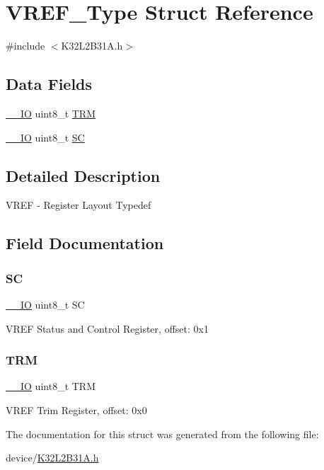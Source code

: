 \hypertarget{struct_v_r_e_f___type}{}\section{V\+R\+E\+F\+\_\+\+Type Struct Reference}
\label{struct_v_r_e_f___type}


{\ttfamily \#include $<$K32\+L2\+B31\+A.\+h$>$}

\subsection*{Data Fields}
\begin{DoxyCompactItemize}
\item 
\mbox{\hyperlink{core__cm0plus_8h_aec43007d9998a0a0e01faede4133d6be}{\+\_\+\+\_\+\+IO}} uint8\+\_\+t \mbox{\hyperlink{struct_v_r_e_f___type_acdaf356ffe42125ef3a82e4439a2e3c9}{T\+RM}}
\item 
\mbox{\hyperlink{core__cm0plus_8h_aec43007d9998a0a0e01faede4133d6be}{\+\_\+\+\_\+\+IO}} uint8\+\_\+t \mbox{\hyperlink{struct_v_r_e_f___type_a369ca7d5284929a823dab79b7d10d81f}{SC}}
\end{DoxyCompactItemize}


\subsection{Detailed Description}
V\+R\+EF -\/ Register Layout Typedef 

\subsection{Field Documentation}
\mbox{\label{struct_v_r_e_f___type_a369ca7d5284929a823dab79b7d10d81f}} 
\subsubsection{\texorpdfstring{SC}{SC}}
{\footnotesize\ttfamily \mbox{\hyperlink{core__cm0plus_8h_aec43007d9998a0a0e01faede4133d6be}{\+\_\+\+\_\+\+IO}} uint8\+\_\+t SC}

V\+R\+EF Status and Control Register, offset\+: 0x1 \mbox{\label{struct_v_r_e_f___type_acdaf356ffe42125ef3a82e4439a2e3c9}} 
\subsubsection{\texorpdfstring{TRM}{TRM}}
{\footnotesize\ttfamily \mbox{\hyperlink{core__cm0plus_8h_aec43007d9998a0a0e01faede4133d6be}{\+\_\+\+\_\+\+IO}} uint8\+\_\+t T\+RM}

V\+R\+EF Trim Register, offset\+: 0x0 

The documentation for this struct was generated from the following file\+:\begin{DoxyCompactItemize}
\item 
device/\mbox{\hyperlink{_k32_l2_b31_a_8h}{K32\+L2\+B31\+A.\+h}}\end{DoxyCompactItemize}
